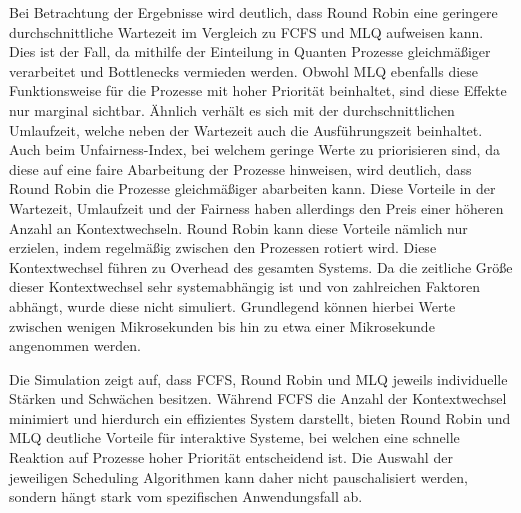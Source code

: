 Bei Betrachtung der Ergebnisse wird deutlich, dass Round Robin eine geringere durchschnittliche Wartezeit im Vergleich zu \ac{FCFS} und \ac{MLQ} aufweisen kann. Dies ist der Fall, da mithilfe der Einteilung in Quanten Prozesse gleichmäßiger verarbeitet und Bottlenecks vermieden werden. Obwohl \ac{MLQ} ebenfalls diese Funktionsweise für die Prozesse mit hoher Priorität beinhaltet, sind diese Effekte nur marginal sichtbar. Ähnlich verhält es sich mit der durchschnittlichen Umlaufzeit, welche neben der Wartezeit auch die Ausführungszeit beinhaltet. Auch beim Unfairness-Index, bei welchem geringe Werte zu priorisieren sind, da diese auf eine faire Abarbeitung der Prozesse hinweisen, wird deutlich, dass Round Robin die Prozesse gleichmäßiger abarbeiten kann. Diese Vorteile in der Wartezeit, Umlaufzeit und der Fairness haben allerdings den Preis einer höheren Anzahl an Kontextwechseln. Round Robin kann diese Vorteile nämlich nur erzielen, indem regelmäßig zwischen den Prozessen rotiert wird. Diese Kontextwechsel führen zu Overhead des gesamten Systems. Da die zeitliche Größe dieser Kontextwechsel sehr systemabhängig ist und von zahlreichen Faktoren abhängt, wurde diese nicht simuliert. Grundlegend können hierbei Werte zwischen wenigen Mikrosekunden bis hin zu etwa einer Mikrosekunde angenommen werden. 

Die Simulation zeigt auf, dass \ac{FCFS}, Round Robin und \ac{MLQ} jeweils individuelle Stärken und Schwächen besitzen. Während \ac{FCFS} die Anzahl der Kontextwechsel minimiert und hierdurch ein effizientes System darstellt, bieten Round Robin und \ac{MLQ} deutliche Vorteile für interaktive Systeme, bei welchen eine schnelle Reaktion auf Prozesse hoher Priorität entscheidend ist. Die Auswahl der jeweiligen Scheduling Algorithmen kann daher nicht pauschalisiert werden, sondern hängt stark vom spezifischen Anwendungsfall ab.